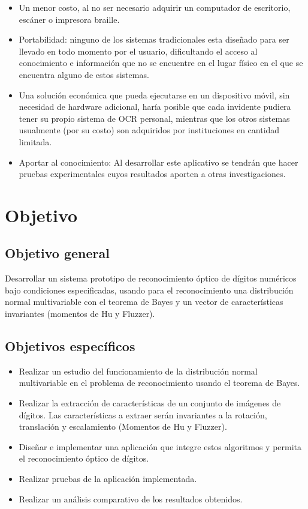 \documentclass[a4paper, 11pt, oneside]{report}
\begin{document}
	\begin{itemize} 

	\item Un menor costo, al no ser necesario adquirir un computador de escritorio, escáner o impresora braille.

	\item Portabilidad: ninguno de los sistemas tradicionales esta diseñado para ser llevado en todo momento por el usuario, dificultando el acceso al conocimiento e información que no se encuentre en el lugar físico en el que se encuentra alguno de estos sistemas.
	
	\item Una solución económica que pueda ejecutarse en un dispositivo móvil, sin necesidad de hardware adicional, haría posible que cada invidente pudiera tener su propio sistema de OCR personal, mientras que los otros sistemas usualmente (por su costo) son adquiridos por instituciones en cantidad limitada.

	\item Aportar al conocimiento: Al desarrollar este aplicativo se tendrán que hacer pruebas experimentales cuyos resultados aporten a otras investigaciones.

	\end{itemize}
	
\section{Objetivo}
\label{sect:objective}
	
	\subsection{Objetivo general}
	Desarrollar un sistema prototipo de reconocimiento óptico de dígitos numéricos bajo condiciones especificadas, usando para el reconocimiento una distribución normal multivariable con el teorema de Bayes y un vector de características invariantes (momentos de Hu y Fluzzer).
	\subsection{Objetivos específicos}
	\begin{itemize}
	\item Realizar un estudio del funcionamiento de la distribución normal multivariable en el problema de reconocimiento usando el teorema de Bayes.
	\item Realizar la extracción de características de un conjunto de imágenes de dígitos. Las características a extraer serán invariantes a la rotación, translación y escalamiento (Momentos de Hu y Fluzzer).
	\item Diseñar e implementar una aplicación que integre estos algoritmos y permita el reconocimiento óptico de dígitos.
	\item Realizar pruebas de la aplicación implementada.
	\item Realizar un análisis comparativo de los resultados obtenidos.
	\end{itemize}
	
\end{document}
